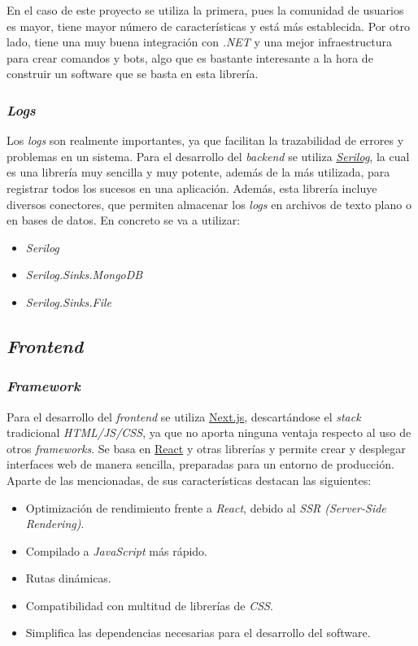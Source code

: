 En el caso de este proyecto se utiliza la primera, pues la comunidad de usuarios es mayor, tiene mayor número de características y está más establecida. Por otro lado, tiene una muy buena integración con \textit{.NET} y una mejor infraestructura para crear comandos y bots, algo que es bastante interesante a la hora de construir un software que se basta en esta librería.

\subsubsection{\textit{Logs}}

Los \textit{logs} son realmente importantes, ya que facilitan la trazabilidad de errores y problemas en un sistema. Para el desarrollo del \textit{backend} se utiliza \href{https://serilog.net/}{\textit{Serilog}}, la cual es una librería muy sencilla y muy potente, además de la más utilizada, para registrar todos los sucesos en una aplicación. Además, esta librería incluye diversos conectores, que permiten almacenar los \textit{logs} en archivos de texto plano o en bases de datos. En concreto se va a utilizar:

\begin{itemize}
	\item \textit{Serilog}
	\item \textit{Serilog.Sinks.MongoDB}
	\item \textit{Serilog.Sinks.File}
\end{itemize}

\subsection{\textit{Frontend}} 

\subsubsection{\textit{Framework}}

Para el desarrollo del \textit{frontend} se utiliza \href{https://nextjs.org/}{Next.js}, descartándose el \textit{stack} tradicional \textit{HTML/JS/CSS}, ya que no aporta ninguna ventaja respecto al uso de otros \textit{frameworks}. Se basa en \href{https://es.reactjs.org/}{React} y otras librerías y permite crear y desplegar interfaces web de manera sencilla, preparadas para un entorno de producción. Aparte de las mencionadas, de sus características destacan las siguientes:

\begin{itemize}
	\item Optimización de rendimiento frente a \textit{React}, debido al \textit{SSR (Server-Side Rendering)}.
	\item Compilado a \textit{JavaScript} más rápido.
	\item Rutas dinámicas.
	\item Compatibilidad con multitud de librerías de \textit{CSS}.
	\item Simplifica las dependencias necesarias para el desarrollo del software.
\end{itemize}

